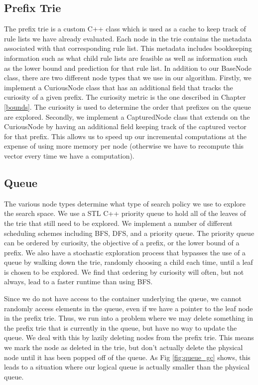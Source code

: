 \subsection{Prefix Trie}
The prefix trie is a custom C++ class which is used as a cache to keep track of rule lists we have already evaluated. 
Each node in the trie contains the metadata associated with that corresponding rule list. 
This metadata includes bookkeeping information such as what child rule lists are feasible as well as information such as the lower bound and prediction for that rule list.
In addition to our BaseNode class, there are two different node types that we use in our algorithm.
Firstly, we implement a CuriousNode class that has an additional field that tracks the curiosity of a given prefix.
The curiosity metric is the one described in Chapter \ref{bounds}.
The curiosity is used to determine the order that prefixes on the queue are explored.
Secondly, we implement a CapturedNode class that extends on the CuriousNode by having an additional field keeping track of the captured vector for that prefix.
This allows us to speed up our incremental computations at the expense of using more memory per node (otherwise we have to recompute this vector every time we have a computation).

\subsection{Queue}
The various node types determine what type of search policy we use to explore the search space.
We use a STL C++ priority queue to hold all of the leaves of the trie that still need to be explored.
We implement a number of different scheduling schemes including BFS, DFS, and a priority queue.
The priority queue can be ordered by curiosity, the objective of a prefix, or the lower bound of a prefix.
We also have a stochastic exploration process that bypasses the use of a queue by walking down the trie, randomly choosing a child each time, until a leaf is chosen to be explored.
We find that ordering by curiosity will often, but not always, lead to a faster runtime than using BFS.

Since we do not have access to the container underlying the queue, we cannot randomly access elements in the queue, even if we have a pointer to the leaf node in the prefix trie.
Thus, we run into a problem where we may delete something in the prefix trie that is currently in the queue, but have no way to update the queue.
We deal with this by lazily deleting nodes from the prefix trie.
This means we mark the node as deleted in the trie, but don't actually delete the physical node until it has been popped off of the queue.
As Fig \ref{fig:queue_gc} shows, this leads to a situation where our logical queue is actually smaller than the physical queue.

